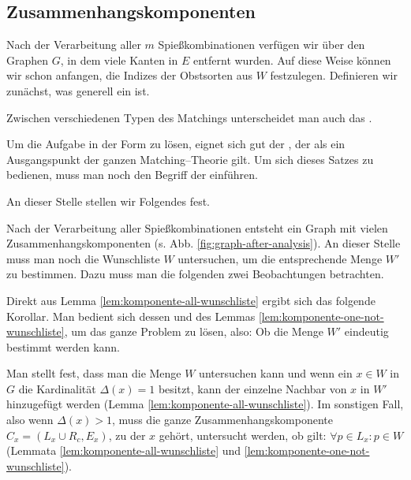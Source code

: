 \subsection{Zusammenhangskomponenten}
Nach der Verarbeitung aller $m$ Spießkombinationen verfügen wir über den Graphen $G$,
in dem viele Kanten in $E$ entfernt wurden.
Auf diese Weise können wir schon anfangen, die Indizes der Obstsorten aus $W$ festzulegen.
Definieren wir zunächst, was generell ein  ist.



Zwischen verschiedenen Typen des Matchings unterscheidet man auch das .



Um die Aufgabe in der Form zu lösen, eignet sich gut der ,
der als ein Ausgangspunkt der ganzen Matching--Theorie gilt. 
Um sich dieses Satzes zu bedienen, muss man noch den Begriff der  einführen.





An dieser Stelle stellen wir Folgendes fest.







Nach der Verarbeitung aller Spießkombinationen entsteht ein Graph mit vielen Zusammenhangskomponenten
(s. Abb. \ref{fig:graph-after-analysis}).
An dieser Stelle muss man noch die Wunschliste $W$ untersuchen, um die entsprechende Menge $W'$ zu bestimmen.
Dazu muss man die folgenden zwei Beobachtungen betrachten.





Direkt aus Lemma \ref{lem:komponente-all-wunschliste} ergibt sich das folgende Korollar.
Man bedient sich dessen und des Lemmas \ref{lem:komponente-one-not-wunschliste}, um das ganze Problem zu lösen, also: Ob die Menge $W'$ eindeutig bestimmt werden kann.



Man stellt fest, dass man die Menge $W$ untersuchen kann und wenn ein $x \in W$ in $G$ die
Kardinalität $\Delta(x) = 1$ besitzt, kann der einzelne Nachbar von $x$ in $W'$ hinzugefügt werden
(Lemma \ref{lem:komponente-all-wunschliste}).
Im sonstigen Fall, also wenn $\Delta(x) > 1$, muss die ganze Zusammenhangskomponente
$C_x = (L_x \cup R_c, E_x)$, zu der $x$ gehört, untersucht werden, ob gilt: $\forall p \in L_x: p \in W$
(Lemmata \ref{lem:komponente-all-wunschliste} und \ref{lem:komponente-one-not-wunschliste}).

